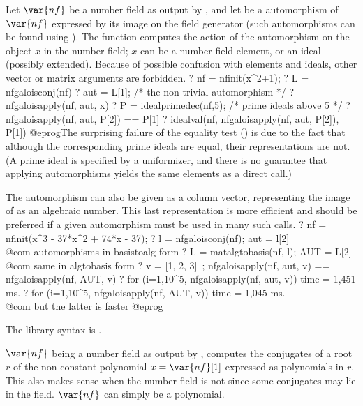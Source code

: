 \label{se:nfgaloisapply}
Let $\var{nf}$ be a
number field as output by , and let  be a 
automorphism of $\var{nf}$ expressed by its image on the field generator
(such automorphisms can be found using ). The function
computes the action of the automorphism  on the object $x$ in the
number field; $x$ can be a number field element, or an ideal (possibly
extended). Because of possible confusion with elements and ideals, other
vector or matrix arguments are forbidden.
 \bprog
 ? nf = nfinit(x^2+1);
 ? L = nfgaloisconj(nf)
 ? aut = L[1]; /* the non-trivial automorphism */
 ? nfgaloisapply(nf, aut, x)
 ? P = idealprimedec(nf,5); /* prime ideals above 5 */
 ? nfgaloisapply(nf, aut, P[2]) == P[1]
 ? idealval(nf, nfgaloisapply(nf, aut, P[2]), P[1])
@eprog\noindent The surprising failure of the equality test () is
due to the fact that although the corresponding prime ideals are equal, their
representations are not. (A prime ideal is specified by a uniformizer, and
there is no guarantee that applying automorphisms yields the same elements
as a direct  call.)

The automorphism can also be given as a column vector, representing the
image of  as an algebraic number. This last
representation is more efficient and should be preferred if a given
automorphism must be used in many such calls.
\bprog
 ? nf = nfinit(x^3 - 37*x^2 + 74*x - 37);
 ? l = nfgaloisconj(nf); aut = l[2] \\ @com automorphisms in basistoalg form
 ? L = matalgtobasis(nf, l); AUT = L[2] \\ @com same in algtobasis form
 ? v = [1, 2, 3]~; nfgaloisapply(nf, aut, v) == nfgaloisapply(nf, AUT, v)
 ? for (i=1,10^5, nfgaloisapply(nf, aut, v))
 time = 1,451 ms.
 ? for (i=1,10^5, nfgaloisapply(nf, AUT, v))
 time = 1,045 ms.  \\ @com but the latter is faster
@eprog

The library syntax is .

\label{se:nfgaloisconj}
$\var{nf}$ being a number field as output by , computes the
conjugates of a root $r$ of the non-constant polynomial $x=\var{nf}[1]$
expressed as polynomials in $r$. This also makes sense when the number field
is not  since some conjugates may lie in the field.
$\var{nf}$ can simply be a polynomial.

